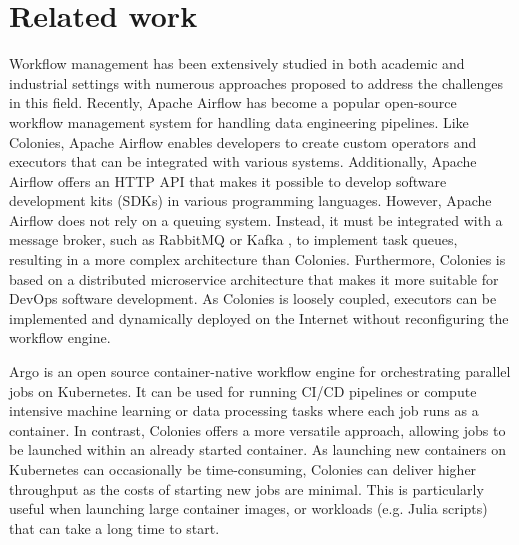 \documentclass{article}
\begin{document}
\section{Related work}
Workflow management has been extensively studied in both academic and industrial settings with numerous approaches \cite{service_wfs, schmitt2022workflow, GarciaRepresa1740746, Ouyang2010, NIKOLOV2021100440, workflow_in_bigdata} proposed to address the challenges in this field. Recently, Apache Airflow \cite{apache_airflow} has become a popular open-source workflow management system for handling data engineering pipelines. Like Colonies, Apache Airflow enables developers to create custom operators and executors that can be integrated with various systems. Additionally, Apache Airflow offers an HTTP API that makes it possible to develop software development kits (SDKs) in various programming languages. However, Apache Airflow does not rely on a queuing system. Instead, it must be integrated with a message broker, such as RabbitMQ \cite{rabbitmq} or Kafka \cite{apache_kafka}, to implement task queues, resulting in a more complex architecture than Colonies. Furthermore, Colonies is based on a distributed microservice architecture that makes it more suitable for DevOps software development. As Colonies is loosely coupled, executors can be implemented and dynamically deployed on the Internet without reconfiguring the workflow engine.

Argo \cite{argowf} is an open source container-native workflow engine for orchestrating parallel jobs on Kubernetes. It can be used for running CI/CD pipelines or compute intensive machine learning or data processing tasks where each job runs as a container. In contrast, Colonies offers a more versatile approach, allowing jobs to be launched within an already started container. As launching new containers on Kubernetes can occasionally be time-consuming, Colonies can deliver higher throughput as the costs of starting new jobs are minimal. This is particularly useful when launching large container images, or workloads (e.g. Julia scripts) that can take a long time to start. 
\end{document}

